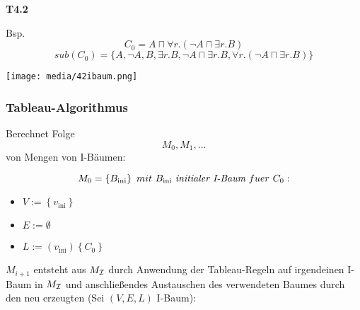\textbf{T4.2}

Bsp. $$C_0 = A \sqcap \forall r.(\neg A \sqcap \exists r.B)$$
$$sub(C_0) = \{A, \neg A, B, \exists r.B, \neg A \sqcap \exists r.B, \forall r.(\neg A \sqcap \exists r.B)\}$$

\texttt{[image: media/42ibaum.png]}

\subsubsection{Tableau-Algorithmus}\label{tableau-algorithmus}

Berechnet Folge $$M_{0},M_{1},\ldots$$ von Mengen von I-Bäumen:

$$M_{0} = \left\{ B_{\text{ini}} \right\}\ mit\ B_{\text{ini}}\ \emph{initialer I-Baum}\ fuer\ C_{0}:$$

\begin{itemize}
\item
  $V := \left\{ v_{\text{ini}} \right\}$
\item
  $E := \emptyset$
\item
  $L := \left( v_{\text{ini}} \right) \left\{ C_{0} \right\}$
\end{itemize}

$M_{i + 1}$ entsteht aus $M_{\mathcal{I}}$ durch Anwendung der Tableau-Regeln
auf irgendeinen I-Baum in $M_{\mathcal{I}}$ und anschließendes Austauschen des
verwendeten Baumes durch den neu erzeugten (Sei $\left( V,E,L \right)$
I-Baum):

